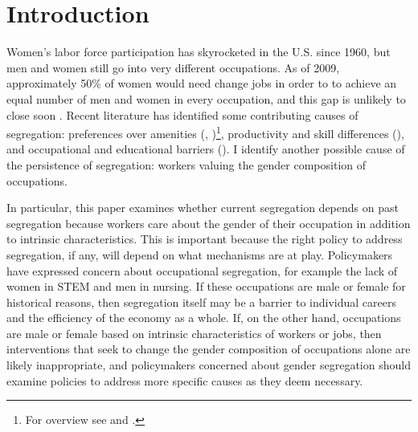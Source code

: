 \documentclass[12pt]{article}
\begin{document}
\newpage
\section{Introduction}




Women's labor force participation has skyrocketed in the U.S. since 1960, but men and women still go into very different occupations. As of 2009, approximately 50\% of women would need change jobs in order to to achieve an equal number of men and women in every occupation, and this gap is unlikely to close soon \cite{Blau2013}. Recent literature has identified some contributing causes of segregation: preferences over amenities (, )\footnote{For overview see  and .}, productivity and skill differences (), and occupational and educational barriers (). I identify another possible cause of the persistence of segregation: workers valuing the gender composition of occupations.

In particular, this paper examines whether current segregation depends on past segregation because workers care about the gender of their occupation in addition to intrinsic characteristics. This is important because the right policy to address segregation, if any, will depend on what mechanisms are at play. Policymakers have expressed concern about occupational segregation, for example the lack of women in STEM and men in nursing. If these occupations are male or female for historical reasons, then segregation itself may be a barrier to individual careers and the efficiency of the economy as a whole. If, on the other hand, occupations are male or female based on intrinsic characteristics of workers or jobs, then interventions that seek to change the gender composition of occupations alone are likely inappropriate, and policymakers concerned about gender segregation should examine policies to address more specific causes as they deem necessary.
\end{document}
